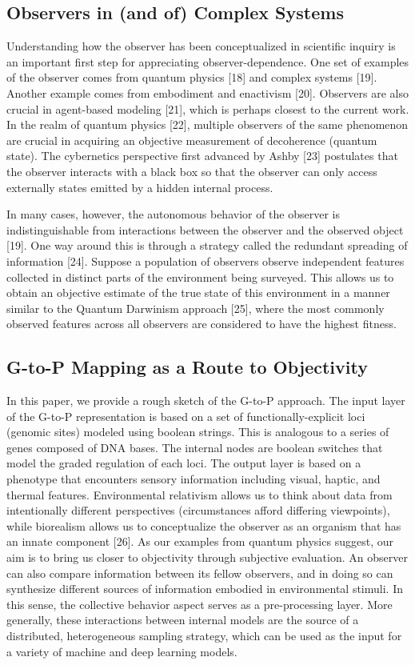 \documentclass{article}
\begin{document}
\subsection{Observers in (and of) Complex Systems}
Understanding how the observer has been conceptualized in scientific inquiry is an important first step for appreciating observer-dependence. One set of examples of the observer comes from quantum physics [18] and complex systems [19]. Another example comes from embodiment and enactivism [20]. Observers are also crucial in agent-based modeling [21], which is perhaps closest to the current work. In the realm of quantum physics [22], multiple observers of the same phenomenon are crucial in acquiring an objective measurement of decoherence (quantum state). The cybernetics perspective first advanced by Ashby [23] postulates that the observer interacts with a black box so that the observer can only access externally states emitted by a hidden internal process.

In many cases, however, the autonomous behavior of the observer is indistinguishable from interactions between the observer and the observed object [19]. One way around this is through a strategy called the redundant spreading of information [24]. Suppose a population of observers observe independent features collected in distinct parts of the environment being surveyed. This allows us to obtain an objective estimate of the true state of this environment in a manner similar to the Quantum Darwinism approach [25], where the most commonly observed features across all observers are considered to have the highest fitness.

\subsection{G-to-P Mapping as a Route to Objectivity}
In this paper, we provide a rough sketch of the G-to-P approach. The input layer of the G-to-P representation is based on a set of functionally-explicit loci (genomic sites) modeled using boolean strings. This is analogous to a series of genes composed of DNA bases. The internal nodes are boolean switches that model the graded regulation of each loci. The output layer is based on a phenotype that encounters sensory information including visual, haptic, and thermal features. Environmental relativism allows us to think about data from intentionally different perspectives (circumstances afford differing viewpoints), while biorealism allows us to conceptualize the observer as an organism that has an innate component [26]. As our examples from quantum physics suggest, our aim is to bring us closer to objectivity through subjective evaluation. An observer can also compare information between its fellow observers, and in doing so can synthesize different sources of information embodied in environmental stimuli. In this sense, the collective behavior aspect serves as a pre-processing layer. More generally, these interactions between internal models are the source of a distributed, heterogeneous sampling strategy, which can be used as the input for a variety of machine and deep learning models.
\end{document}
